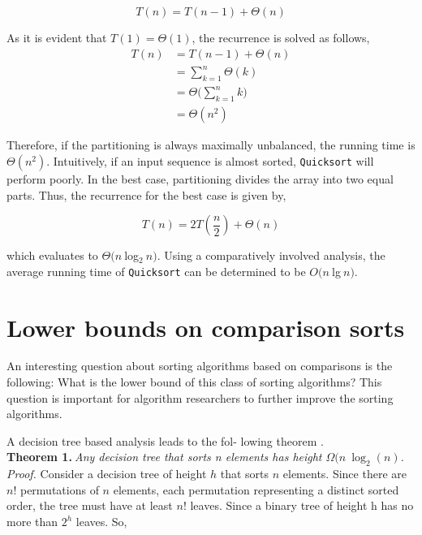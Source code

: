\documentclass[twocolumn,a4paper]{article}
\begin{document}
            $$T(n) = T(n - 1) + \Theta(n)$$

        As it is evident that $T(1) = \Theta(1)$, the recurrence is solved as follows,
        \begin{align*}
            T(n) &= T(n - 1) + \Theta(n)\\
            &= \sum_{k=1}^{n}\Theta(k)\\
            &= \Theta \Bigg(\sum_{k=1}^{n}k \Bigg)\\
            &= \Theta(n^2)
        \end{align*}

        Therefore, if the partitioning is always maximally unbalanced, the running time is $\Theta(n^2)$.
        Intuitively, if an input sequence is almost sorted, \texttt{Quicksort} will perform poorly.
        In the best case, partitioning divides the array into two equal parts.
        Thus, the recurrence for the best case is given by,

            $$T(n) = 2T\left(\frac{n}{2}\right) + \Theta(n)$$

        \noindent which evaluates to $\Theta(n\:$log$_2\:n)$.
        Using a comparatively involved analysis, the average running time of \texttt{Quicksort} can be determined to be $O(n\:$lg$\:n)$.

    \section{Lower bounds on comparison sorts}
        An interesting question about sorting algorithms based on comparisons is the following:
        What is the lower bound of this class of sorting algorithms?
        This question is important for algorithm researchers to further improve the sorting algorithms.\par
            A decision tree based analysis leads to the fol- lowing theorem \cite{clrs}.\\[-2mm]

        \noindent\textbf{Theorem 1.}$\:$\textit{Any decision tree that sorts n elements has height $\Omega(n\!\:\log_2(n)$.}\\[-2mm]
        
        \noindent\textit{Proof.} Consider a decision tree of height $h$ that sorts $n$ elements.
        Since there are $n!$ permutations of $n$ elements, each permutation representing a distinct sorted order, the tree must have at least $n!$ leaves.
        Since a binary tree of height h has no more than $2^h$ leaves. So,
\end{document}
